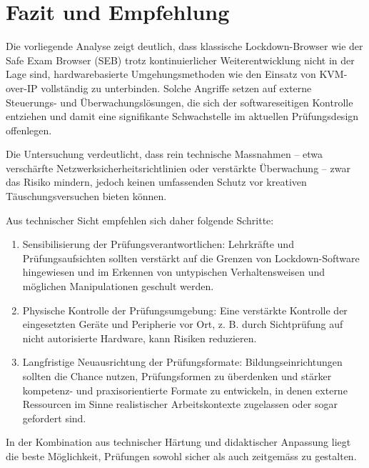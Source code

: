 \documentclass[14pt]{article}
\begin{document}
\section{Fazit und Empfehlung}

Die vorliegende Analyse zeigt deutlich, dass klassische Lockdown-Browser wie der Safe Exam Browser (SEB) trotz kontinuierlicher Weiterentwicklung nicht in der Lage sind, hardwarebasierte Umgehungsmethoden wie den Einsatz von KVM-over-IP vollständig zu unterbinden. Solche Angriffe setzen auf externe Steuerungs- und Überwachungslösungen, die sich der softwareseitigen Kontrolle entziehen und damit eine signifikante Schwachstelle im aktuellen Prüfungsdesign offenlegen.

Die Untersuchung verdeutlicht, dass rein technische Massnahmen – etwa verschärfte Netzwerksicherheitsrichtlinien oder verstärkte Überwachung – zwar das Risiko mindern, jedoch keinen umfassenden Schutz vor kreativen Täuschungsversuchen bieten können.

Aus technischer Sicht empfehlen sich daher folgende Schritte:

\begin{enumerate}
\item Sensibilisierung der Prüfungsverantwortlichen: Lehrkräfte und Prüfungsaufsichten sollten verstärkt auf die Grenzen von Lockdown-Software hingewiesen und im Erkennen von untypischen Verhaltensweisen und möglichen Manipulationen geschult werden.

\item Physische Kontrolle der Prüfungsumgebung: Eine verstärkte Kontrolle der eingesetzten Geräte und Peripherie vor Ort, z. B. durch Sichtprüfung auf nicht autorisierte Hardware, kann Risiken reduzieren.

\item Langfristige Neuausrichtung der Prüfungsformate: Bildungseinrichtungen sollten die Chance nutzen, Prüfungsformen zu überdenken und stärker kompetenz- und praxisorientierte Formate zu entwickeln, in denen externe Ressourcen im Sinne realistischer Arbeitskontexte zugelassen oder sogar gefordert sind.

\end{enumerate}

In der Kombination aus technischer Härtung und didaktischer Anpassung liegt die beste Möglichkeit, Prüfungen sowohl sicher als auch zeitgemäss zu gestalten.
\end{document}
